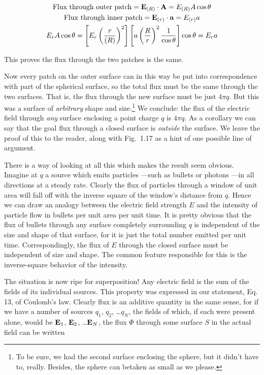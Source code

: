 \begin{gather*}
\text{Flux through outer patch} =  \mathbf{E}_{(R)} \cdot \mathbf{A} =   E_ {(R)}  A\cos\theta \\
\text{Flux through inner patch} =  \mathbf{E}_ {(r)} \cdot \mathbf{a} =   E_ {(r)}  a \\
E_r A\cos\theta =  \left[E_r \left(\frac{r}{(R)} \right)^2  \right]
                   \left[a\left(\frac{R}{r} \right)^2  \frac{1}{\cos\theta}\right]
                   \cos\theta =  E_r a
\end{gather*}

\noindent This proves the flux through the two patches is the same.

Now every patch on the outer surface can in this way be put into
correspondence with part of the spherical surface, so the total flux
must be the same through the two surfaces. That is, the flux through
the new surface must be just $4 \pi q$. But this was a surface of
\emph{arbitrary} shape and size.\footnote{To be sure, we had the
second surface enclosing the sphere, but it didn't have to, really.
Besides, the sphere can betaken as small as we please.} We conclude:
the flux of the electric field through \emph{any} surface enclosing a
point charge $q$ is $4 \pi q$. As a corollary we can say that the
goal flux through a closed surface is \emph{outside} the surface. We
leave the proof of this to the reader, along with Fig.~1.17 as a
hint of one possible line of argument.

There is a way of looking at all this which makes the result seem
obvious. Imagine at $q$ a source which emits particles ---such as
bullets or photons ---in all directions at a steady rate. Clearly the
flux of particles through a window of unit area will fall off with
the inverse square of the window's distance from $q$. Hence we can
draw an analogy between the electric field strength $E$ and the
intensity of particle flow in bullets per unit area per unit time. It
is pretty obvious that the flux of bullets through any surface
completely surrounding $q$ is independent of the size and shape of
that surface, for it is just the total number emitted per unit time.
Correspondingly, the flux of $E$ through the closed surface must be
independent of size 
and shape. The common feature
responsible for this is the inverse-square behavior of the intensity.

The situation is now ripe for superposition! Any electric field is
the sum of the fields of its individual sources. This property was
expressed in our statement, Eq. 13, of Coulomb's law. Clearly flux
is an additive quantity in the same sense, for if we have a number of
sources $q_1$, $q_2$, \ldots $q_N$, the fields of which, if each were
present alone, would be $\mathbf{E}_1$, $\mathbf{E}_2$, \ldots $\mathbf{E}_N$, the
flux $\Phi$ through some surface $S$ in the actual field can be written

